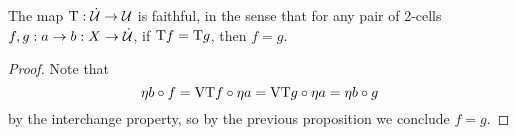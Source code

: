 \documentclass[../thesis.tex]{subfiles}
\begin{document}
\begin{proposition}
  The map ${{\mathrm{T}}} : \dot{{\mathcal{U}}} \to {\mathcal{U}}$ is faithful, in the sense that for any pair of 2-cells $f,g : a \to b
  : X \to \dot{{\mathcal{U}}}$, if ${{\mathrm{T}}} f = {{\mathrm{T}}} g$, then $f = g$. 
\end{proposition}
\begin{proof}
  Note that
  \[\eta b \circ f = {{\mathrm{V}}}{{\mathrm{T}}} f \circ \eta a = {{\mathrm{V}}}{{\mathrm{T}}} g \circ \eta a = \eta b \circ g\]
  by the interchange property, so by the previous proposition we conclude $f = g$.
\end{proof}

\end{document}
